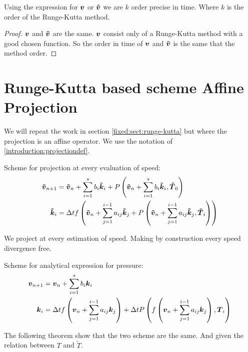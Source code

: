 \begin{corollary}
  Using the expression for ${\boldsymbol {v}}$ or ${\boldsymbol {\tilde{v}}}$ we are $k$ order precise in time. Where $k$ is the order of the Runge-Kutta method.
\end{corollary}
\begin{proof}
  ${\boldsymbol {v}}$ and ${\boldsymbol {\tilde{v}}}$ are the same.
  ${\boldsymbol {v}}$ consist only of a Runge-Kutta method with a good chosen function.
  So the order in time of ${\boldsymbol {v}}$ and ${\boldsymbol {\tilde{v}}}$ is the same that the method order.
\end{proof}


\section{Runge-Kutta based scheme Affine Projection}
\label{fixed:sect:runge-kutta:affine}
We will repeat the work in section \ref{fixed:sect:runge-kutta} but where the projection is an affine operator.
We use the notation of \ref{introduction:projectiondef}.

Scheme for projection at every evaluation of speed:
\begin{subequations}
\begin{align}
{\boldsymbol {\tilde{v}}}_{n+1}&={\boldsymbol {\tilde{v}}}_{n}+\sum_{i=1}^{s}b_{i}{\boldsymbol {\tilde{k}}}_{i}+P\left({\boldsymbol {\tilde{v}}}_{n}+\sum_{i=1}^{s}b_{i}{\boldsymbol {\tilde{k}}}_{i},{\boldsymbol {\tilde{T}}}_0\right)\\
{\boldsymbol {\tilde{k}}}_{i}&=\Delta t f\left({\boldsymbol {\tilde{v}}}_{n}+\sum_{j=1}^{i-1}a_{ij}{\boldsymbol {\tilde{k}}}_{j}+P\left({\boldsymbol {\tilde{v}}}_{n}+\sum_{j=1}^{i-1}a_{ij}{\boldsymbol {\tilde{k}}}_{j},{\boldsymbol {\tilde{T}}}_i\right)\right)
\end{align}
\end{subequations}

We project at every estimation of speed. Making by construction every speed divergence free.

Scheme for analytical expression for pressure:
\begin{subequations}
\begin{align}
	{\boldsymbol {v}}_{n+1}&={\boldsymbol {v}}_{n}+\sum_{i=1}^{s}b_{i}{\boldsymbol {k}}_{i}\\
	{\boldsymbol {k}}_{i}&=\Delta t f\left({\boldsymbol {v}}_{n}+\sum_{j=1}^{i-1}a_{ij}{\boldsymbol {k}}_{j}\right)+\Delta t P\left(f\left({\boldsymbol {v}}_{n}+\sum_{j=1}^{i-1}a_{ij}{\boldsymbol {k}}_{j}\right),{\boldsymbol {T}}_{i}\right)
\end{align}
\end{subequations}

The following theorem show that the two scheme are the same. And given the relation between $T$ and $\tilde{T}$.

